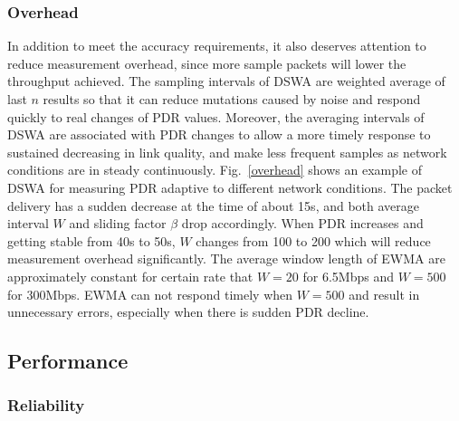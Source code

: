 \documentclass[draftclsnofoot,conference,onecolumn,11pt]{IEEEtran}
\begin{document}
\subsubsection{Overhead}
In addition to meet the accuracy requirements, it also deserves attention to reduce measurement overhead, since more sample packets will lower the throughput achieved. The sampling intervals of DSWA are weighted average of last $n$ results so that it can reduce mutations caused by noise and respond quickly to real changes of PDR values. Moreover, the averaging intervals of DSWA are associated with PDR changes to allow a more timely response to sustained decreasing in link quality, and make less frequent samples as network conditions are in steady continuously. Fig.~\ref{overhead} shows an example of DSWA for measuring PDR adaptive to different network conditions. The packet delivery has a sudden decrease at the time of about 15s, and both average interval $W$ and sliding factor $\beta$ drop accordingly. When PDR increases and getting stable from 40s to 50s, $W$ changes from 100 to 200 which will reduce measurement overhead significantly. The average window length of EWMA are approximately constant for certain rate that $W=20$ for 6.5Mbps and $W=500$ for 300Mbps. EWMA can not respond timely when $W=500$ and result in unnecessary errors, especially when there is sudden PDR decline.

\subsection{Performance}

\subsubsection{Reliability}
\end{document}
